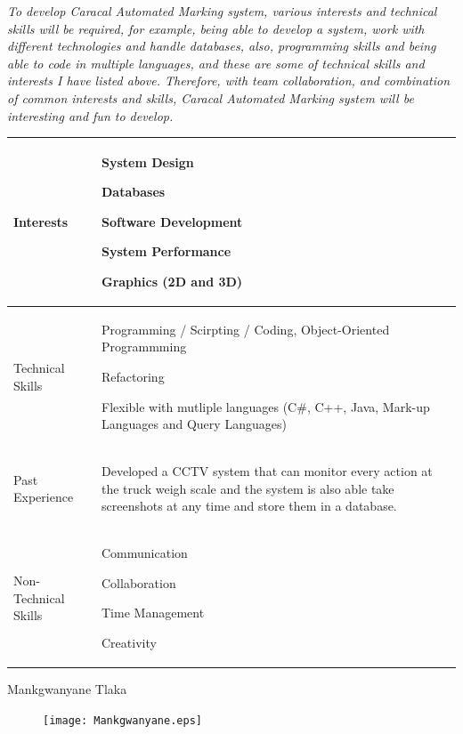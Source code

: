 \documentclass{article}
\begin{document}
 	\textit{To develop Caracal Automated Marking system, various interests and technical skills will be required, for example, being able to develop a system, work with different technologies and handle databases, also, programming skills and being able to code in multiple languages, and these are some of technical skills and interests I have listed above. Therefore, with team collaboration, and combination of common interests and skills, Caracal Automated Marking system will be interesting and fun to develop.}

\begin{center}
\begin{tabularx}{1.0\textwidth}{|p{3cm}|X|}
\hline
 {\LARGE Interests} & 
 \begin{compactitem}
     \item {\large System Design}
     \item {\large Databases}
     \item {\large Software Development}
	 \item {\large System Performance}
	 \item {\large Graphics (2D and 3D)}
 \end{compactitem} \\ 
 \hline
 {\LARGE Technical Skills} & 
 \begin{compactitem}
     \item {\large Programming / Scirpting / Coding, Object-Oriented Programmming}
     \item {\large Refactoring}
     \item {\large Flexible with mutliple languages (C#, C++, Java, Mark-up Languages and Query Languages)}
 \end{compactitem} \\ 
 \hline
 {\LARGE Past Experience} & 
 \begin{compactitem}
     \item {\large Developed a CCTV system that can monitor every action at the truck weigh scale and the system is also able take screenshots at any time and store them in a database.}
 \end{compactitem} \\ 
 \hline
 {\LARGE Non-Technical Skills} & 
 \begin{compactitem}
     \item {\large Communication}
     \item {\large Collaboration}
	 \item {\large Time Management}
	 \item {\large Creativity}
 \end{compactitem} \\
 \hline 
\end{tabularx}
\end{center}
\pagebreak
{\huge Mankgwanyane Tlaka}
\begin{figure}[h]
\centering
\texttt{[image: Mankgwanyane.eps]} 
\end{figure}
\end{document}
